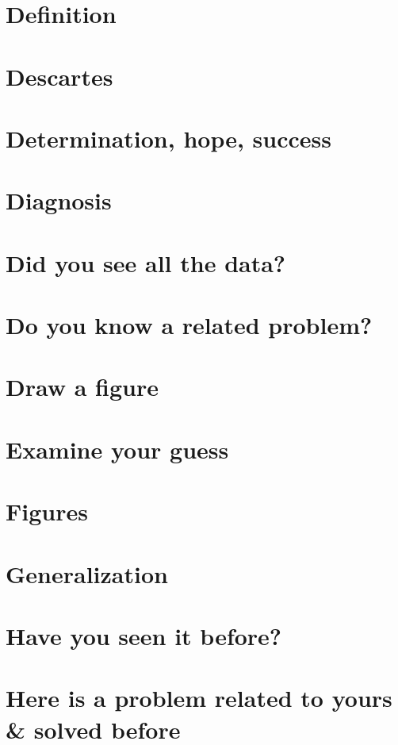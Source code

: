 \documentclass[oneside]{book}
\numberwithin{equation}{section}
\begin{document}
\section{Definition}

\section{Descartes}

\section{Determination, hope, success}

\section{Diagnosis}

\section{Did you see all the data?}

\section{Do you know a related problem?}

\section{Draw a figure}

\section{Examine your guess}

\section{Figures}

\section{Generalization}

\section{Have you seen it before?}

\section{Here is a problem related to yours \& solved before}
\end{document}
